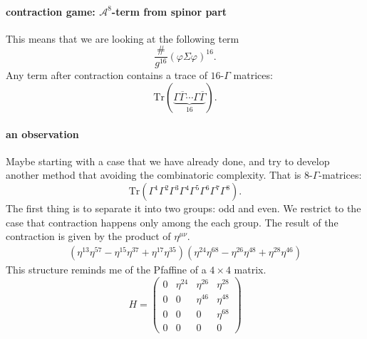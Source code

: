 
\paragraph{contraction game: $\mathcal{A}^8$-term from spinor part}
This means that we are looking at the following term
\[
	\frac{\#}{g^{16}} (\varphi \Sigma \varphi)^{16}
.\] 
Any term after contraction contains a trace of $16$-$\Gamma$ matrices:
\[
\mathrm{Tr}(\underbrace{\Gamma \overline{\Gamma} \cdots 
\Gamma \overline{\Gamma}}_{16})
.\]

\paragraph{an observation}
Maybe starting with a case that we have already done,
and try to develop another method that avoiding the combinatoric complexity.
That is $8$-$\Gamma$-matrices:
\[
\mathrm{Tr}(\Gamma^1 \Gamma^2 \Gamma^3 \Gamma^4 
\Gamma^5 \Gamma^6 \Gamma^7 \Gamma^8)
.\] 
The first thing is to separate it into two groups: odd and even.
We restrict to the case that contraction happens only among the each group.
The result of the contraction is given by the product of $\eta^{\mu\nu}$.
\begin{align*}
	(\eta^{13} \eta^{57} - \eta^{15} \eta^{37} + \eta^{17} \eta^{35})
	(\eta^{24} \eta^{68} - \eta^{26} \eta^{48} + \eta^{28} \eta^{46})
\end{align*}
This structure reminds me of the Pfaffine of a $4\times 4$ matrix.
\begin{equation*}
	H =
	\begin{pmatrix}
		0 & \eta^{24} & \eta^{26} & \eta^{28} \\
		0 & 0 & \eta^{46} & \eta^{48} \\
		0& 0& 0 & \eta^{68} \\
		0& 0& 0& 0
	\end{pmatrix}
\end{equation*}

